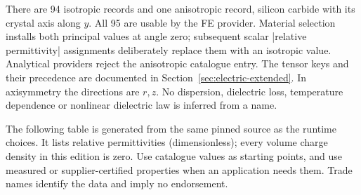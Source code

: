 \begin{codeexample}[width=0pt]
\end{codeexample}

There are 94 isotropic records and one anisotropic record, silicon carbide
with its crystal axis along $y$. All 95 are usable by the FE provider. Material
selection installs both principal values at angle zero; subsequent scalar
|relative permittivity| assignments deliberately replace them with an isotropic
value. Analytical providers reject the anisotropic catalogue entry.
The tensor keys and their precedence are documented in
Section~\ref{sec:electric-extended}. In axisymmetry the directions are $r,z$.
No dispersion, dielectric loss, temperature dependence or nonlinear dielectric
law is inferred from a name.

The following table is generated from the same pinned source as the runtime
choices. It lists relative permittivities (dimensionless); every volume charge
density in this edition is zero. Use catalogue values as starting points,
and use measured or supplier-certified properties when an application needs
them. Trade names identify the data and imply no endorsement.



